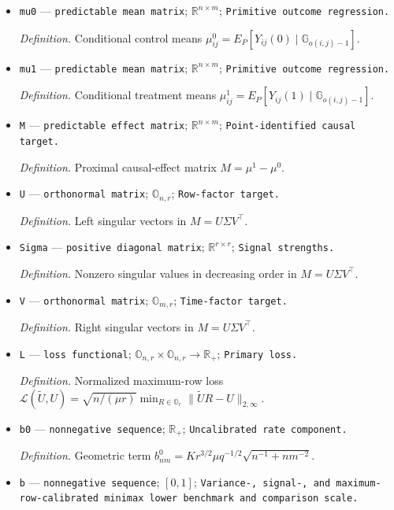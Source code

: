 \documentclass{article}
\begin{document}
\begin{itemize}
  \item \texttt{mu0} --- \texttt{predictable mean matrix}; \(\mathbb R^{n\times m}\); \texttt{Primitive outcome regression.}
  \par\smallskip\noindent\emph{Definition.} Conditional control means \(\mu^0_{ij}=E_P[Y_{ij}(0)\mid\mathbb G_{o(i,j)-1}]\).
  \item \texttt{mu1} --- \texttt{predictable mean matrix}; \(\mathbb R^{n\times m}\); \texttt{Primitive outcome regression.}
  \par\smallskip\noindent\emph{Definition.} Conditional treatment means \(\mu^1_{ij}=E_P[Y_{ij}(1)\mid\mathbb G_{o(i,j)-1}]\).
  \item \texttt{M} --- \texttt{predictable effect matrix}; \(\mathbb R^{n\times m}\); \texttt{Point-\allowbreak{}identified causal target.}
  \par\smallskip\noindent\emph{Definition.} Proximal causal-effect matrix \(M=\mu^1-\mu^0\).
  \item \texttt{U} --- \texttt{orthonormal matrix}; \(\mathbb O_{n,r}\); \texttt{Row-\allowbreak{}factor target.}
  \par\smallskip\noindent\emph{Definition.} Left singular vectors in \(M=U\Sigma V^\top\).
  \item \texttt{Sigma} --- \texttt{positive diagonal matrix}; \(\mathbb R^{r\times r}\); \texttt{Signal strengths.}
  \par\smallskip\noindent\emph{Definition.} Nonzero singular values in decreasing order in \(M=U\Sigma V^\top\).
  \item \texttt{V} --- \texttt{orthonormal matrix}; \(\mathbb O_{m,r}\); \texttt{Time-\allowbreak{}factor target.}
  \par\smallskip\noindent\emph{Definition.} Right singular vectors in \(M=U\Sigma V^\top\).
  \item \texttt{L} --- \texttt{loss functional}; \(\mathbb O_{n,r}\times\mathbb O_{n,r}\to\mathbb R_+\); \texttt{Primary loss.}
  \par\smallskip\noindent\emph{Definition.} Normalized maximum-row loss \(\mathcal L(\widetilde U,U)=\sqrt{n/(\mu r)}\min_{R\in\mathbb O_r}\lVert\widetilde U R-U\rVert_{2,\infty}\).
  \item \texttt{b0} --- \texttt{nonnegative sequence}; \(\mathbb R_+\); \texttt{Uncalibrated rate component.}
  \par\smallskip\noindent\emph{Definition.} Geometric term \(b^0_{nm}=K r^{3/2}\mu q^{-1/2}\sqrt{n^{-1}+nm^{-2}}\).
  \item \texttt{b} --- \texttt{nonnegative sequence}; \([0,1]\); \texttt{Variance-\allowbreak{},\allowbreak{} signal-\allowbreak{},\allowbreak{} and maximum-\allowbreak{}row-\allowbreak{}calibrated minimax lower benchmark and comparison scale.}

\end{itemize}
\end{document}
